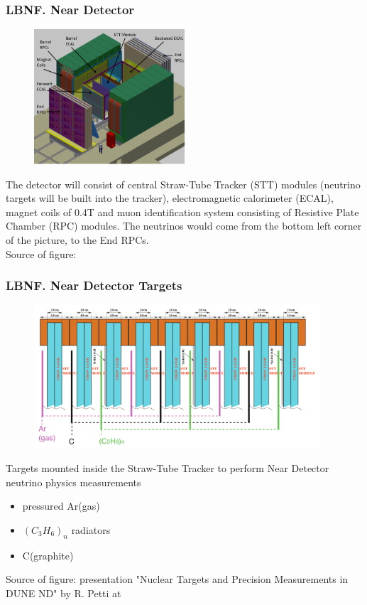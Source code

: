 \begin{frame}\frametitle{LBNF. Near Detector}
\scriptsize
\begin{figure}
\label{fig:nearDetector}
\centering
\includegraphics[width=0.50\textwidth, keepaspectratio=true]{figs/nearDetector.png}
\end{figure}
\scriptsize
The detector will consist of central Straw-Tube Tracker (STT) modules (neutrino targets will be built into the tracker), electromagnetic calorimeter (ECAL), magnet coils of 0.4T and muon identification system consisting of Resistive Plate Chamber (RPC) modules. The neutrinos would come from the bottom left corner of the picture, to the End RPCs.\\
\tiny
Source of figure: \cite{ref_LBNFdoc_volume-detectors}
\end{frame}

\begin{frame}\frametitle{LBNF. Near Detector Targets}
\scriptsize
\begin{figure}
\centering
\includegraphics[width=0.95\textwidth, keepaspectratio=true]{figs/nearDetector_targetsMain.png}
\end{figure}
\scriptsize
Targets mounted inside the Straw-Tube Tracker to perform Near Detector neutrino physics measurements 
\begin{itemize}
  \item pressured Ar(gas)
  \item $(C_3H_6)_n$ radiators
  \item C(graphite)
\end{itemize}
\tiny
Source of figure: presentation "Nuclear Targets and Precision Measurements in DUNE ND" by R. Petti at \cite{ref_LBNF_collaborationMeeting}
\end{frame}



